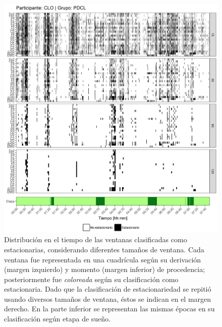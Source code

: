 \documentclass[12pt,letterpaper,draft]{book}
\begin{document}
\begin{figure}
\centering
\includegraphics[width=\linewidth]
{./scripts_graf_res/CLO_patrones_2.png}
\caption[Distribución en el tiempo de las ventanas clasificadas como estacionarias, considerando diferentes tamaños de ventana]{Distribución en el tiempo de las ventanas clasificadas como estacionarias, considerando diferentes tamaños de ventana. 
Cada ventana fue representada en una cuadrícula según su derivación (margen izquierdo) y momento (margen inferior) de procedencia; posteriormente fue \textit{coloreada} según su clasificación como estacionaria.
Dado que la clasificación de estacionariedad se repitió usando diversos tamaños de ventana, éstos se indican en el margen derecho.
En la parte inferior se representan las mismas épocas en su clasificación según etapa de sueño.}
\end{figure}
\end{document}
